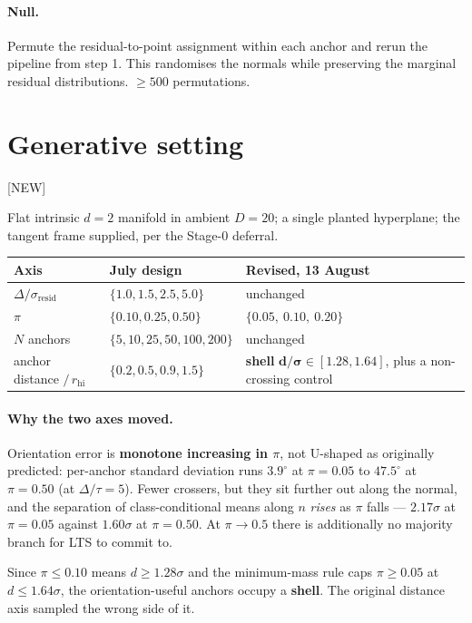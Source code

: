 \documentclass[11pt]{article}
\newcommand{\provtag}[2]{{\footnotesize\sffamily\textcolor{#1}{[#2]}}}
\newcommand{\NEWT}{\provtag{newmag}{NEW}}
\begin{document}
\paragraph{Null.} Permute the residual-to-point assignment within each anchor and rerun the
pipeline from step 1. This randomises the normals while preserving the marginal residual
distributions. $\ge 500$ permutations.

\section{Generative setting} \NEWT

Flat intrinsic $d = 2$ manifold in ambient $D = 20$; a single planted hyperplane; the tangent
frame supplied, per the Stage-0 deferral.

\begin{table}[h]
\small\centering
\begin{tabular}{@{}lll@{}}
\toprule
\textbf{\sffamily Axis} & \textbf{\sffamily 31 July design} & \textbf{\sffamily Revised, 13 August}\\
\midrule
$\Delta/\sigma_{\text{resid}}$ & $\{1.0, 1.5, 2.5, 5.0\}$ & unchanged\\
$\pi$ & $\{0.10, 0.25, 0.50\}$ & $\bm{\{0.05,\ 0.10,\ 0.20\}}$\\
$N$ anchors & $\{5,10,25,50,100,200\}$ & unchanged\\
anchor distance $/\,r_{\text{hi}}$ & $\{0.2, 0.5, 0.9, 1.5\}$
  & \textbf{shell} $\bm{d/\sigma \in [1.28, 1.64]}$, plus a non-crossing control\\
\bottomrule
\end{tabular}
\end{table}

\paragraph{Why the two axes moved.} Orientation error is \textbf{monotone increasing in $\pi$},
not U-shaped as originally predicted: per-anchor standard deviation runs $3.9^\circ$ at
$\pi = 0.05$ to $47.5^\circ$ at $\pi = 0.50$ (at $\Delta/\tau = 5$). Fewer crossers, but they
sit further out along the normal, and the separation of class-conditional means along $n$
\emph{rises} as $\pi$ falls --- $2.17\sigma$ at $\pi = 0.05$ against $1.60\sigma$ at
$\pi = 0.50$. At $\pi \to 0.5$ there is additionally no majority branch for LTS to commit to.

Since $\pi \le 0.10$ means $d \ge 1.28\sigma$ and the minimum-mass rule caps $\pi \ge 0.05$
at $d \le 1.64\sigma$, the orientation-useful anchors occupy a \textbf{shell}. The original
distance axis sampled the wrong side of it.
\end{document}
